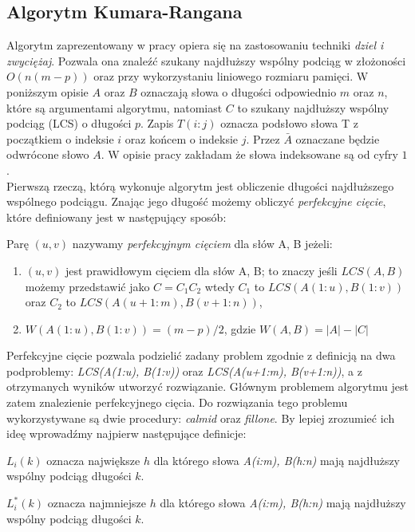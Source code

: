 \subsection{Algorytm Kumara-Rangana}
Algorytm zaprezentowany w pracy opiera się na zastosowaniu techniki \textit{dziel i zwyciężaj}. Pozwala ona znaleźć szukany najdłuższy wspólny podciąg w złożoności $O(n(m - p))$ oraz przy wykorzystaniu liniowego rozmiaru pamięci. W poniższym opisie $A$ oraz $B$ oznaczają słowa o długości odpowiednio $m$ oraz $n$, które są argumentami algorytmu, natomiast $C$ to szukany najdłuższy wspólny podciąg (LCS) o długości $p$. Zapis $T(i:j)$ oznacza podsłowo słowa T z początkiem o indeksie $i$ oraz końcem o indeksie $j$. Przez $\bar{A}$ oznaczane będzie odwrócone słowo $A$. W opisie pracy zakładam że słowa indeksowane są od cyfry $1$.\\
Pierwszą rzeczą, którą wykonuje algorytm jest obliczenie długości najdłuższego wspólnego podciągu. Znając jego długość możemy obliczyć \textit{perfekcyjne cięcie}, które definiowany jest w następujący sposób:
\begin{definition}{}
Parę $(u, v)$ nazywamy \textit{perfekcyjnym cięciem} dla słów A, B jeżeli:
\begin{enumerate}
    \item $(u, v)$ jest prawidłowym cięciem dla słów A, B; to znaczy jeśli $LCS(A, B)$ możemy przedstawić jako $C = C_1C_2$ wtedy $C_1$ to $LCS(A(1:u), B(1:v))$ oraz $C_2$ to $LCS(A(u+1:m), B(v+1:n))$,
    \item $W(A(1:u), B(1:v)) = (m - p)/2$, gdzie $W(A, B) = |A| - |C|$
\end{enumerate}
\end{definition}
Perfekcyjne cięcie pozwala podzielić zadany problem zgodnie z definicją na dwa podproblemy: \textit{LCS(A(1:u), B(1:v))} oraz \textit{LCS(A(u+1:m), B(v+1:n))}, a z otrzymanych wyników utworzyć rozwiązanie.
Głównym problemem algorytmu jest zatem znalezienie perfekcyjnego cięcia. Do rozwiązania tego problemu wykorzystywane są dwie procedury: \textit{calmid} oraz \textit{fillone}. By lepiej zrozumieć ich ideę wprowadźmy najpierw następujące definicje:
\begin{definition}{}{}
$L_i(k)$ oznacza największe $h$ dla którego słowa \textit{A(i:m), B(h:n)} mają najdłuższy wspólny podciąg długości $k$.
\end{definition}
\begin{definition}{}{}
$L_i^*(k)$ oznacza najmniejsze $h$ dla którego słowa \textit{A(i:m), B(h:n)} mają najdłuższy wspólny podciąg długości $k$.
\end{definition}
